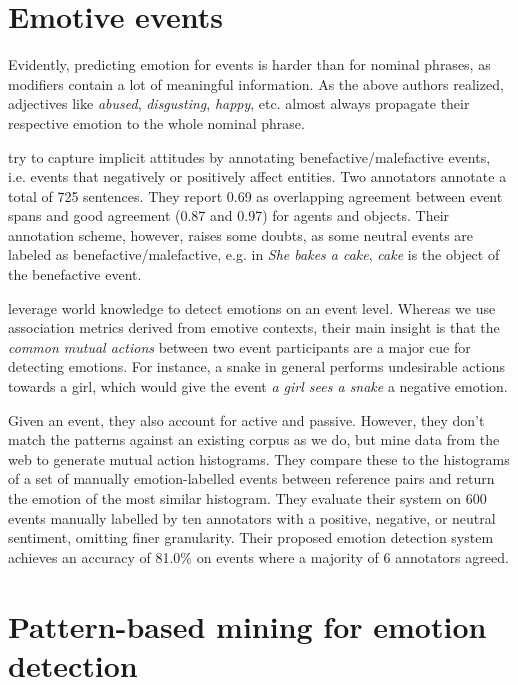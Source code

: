 \section{Emotive events}

Evidently, predicting emotion for events is harder than for nominal phrases, as modifiers contain a lot of meaningful information. As the above authors realized, adjectives like \textit{abused}, \textit{disgusting}, \textit{happy}, etc. almost always propagate their respective emotion to the whole nominal phrase.

\citeauthor{benefactive_malefactive} try to capture implicit attitudes by annotating benefactive/malefactive events, i.e. events that negatively or positively affect entities. Two annotators annotate a total of 725 sentences. They report 0.69 as overlapping agreement between event spans and good agreement (0.87 and 0.97) for agents and objects. Their annotation scheme, however, raises some doubts, as some neutral events are labeled as benefactive/malefactive, e.g. in \textit{She bakes a cake}, \textit{cake} is the object of the benefactive event.

\citeauthor{mutual_action} leverage world knowledge to detect emotions on an event level. Whereas we use association metrics derived from emotive contexts, their main insight is that the \textit{common mutual actions} between two event participants are a major cue for detecting emotions. For instance, a snake in general performs undesirable actions towards a girl, which would give the event \textit{a girl sees a snake} a negative emotion.

Given an event, they also account for active and passive. However, they don't match the patterns against an existing corpus as we do, but mine data from the web to generate mutual action histograms. They compare these to the histograms of a set of manually emotion-labelled events between reference pairs and return the emotion of the most similar histogram. They evaluate their system on 600 events manually labelled by ten annotators with a positive, negative, or neutral sentiment, omitting finer granularity. Their proposed emotion detection system achieves an accuracy of 81.0\% on events where a majority of 6 annotators agreed.

\section{Pattern-based mining for emotion detection} \label{sec:web-mining}

